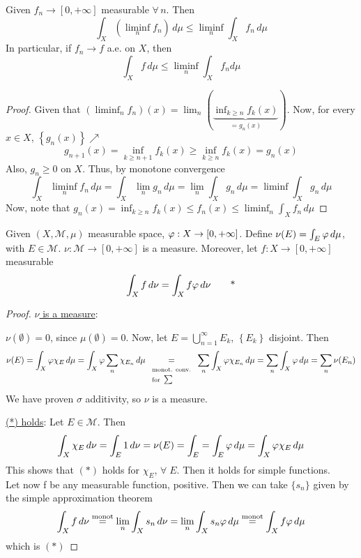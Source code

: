 \begin{lemma}
    Given \(f_n \to [0, +\infty]\) measurable \(\forall \, n\). Then 
    \[
        \int_X (\liminf_n f_n) \, d\mu \leq \liminf_n \int_X f_n \, d\mu
    \]
    In particular, if \(f_n \to f\) a.e. on \(X\), then
    \[
        \int_X f \, d\mu \leq \liminf_n \int_X f_n d\mu
    \]
\end{lemma}

\begin{proof}
    Given that \((\liminf_n f_n)(x) = \lim_n (\underbrace{\inf_{k \geq n} f_k(x)}_{= g_n (x)})\). Now, for every \(x \in X\), \(\left\{ g_n(x) \right\}\nearrow\)
    \[
        g_{n+1}(x) = \inf_{k \geq n+1} f_k(x) \geq \inf_{k \geq n} f_k(x) = g_n (x)
    \]
    Also, \(g_n \geq 0\) on \(X\). Thus, by monotone convergence
    \[
        \int_X \liminf_n f_n \, d\mu = \int_X \lim_n g_n \, d\mu = \lim_n \int_X g_n \, d\mu = \liminf \int_X g_n \, d\mu
    \]
    Now, note that \(g_n (x) = \inf_{k\geq n} f_k(x) \leq f_n(x) \leq \liminf_n \int_X f_n \, d\mu\) 
\end{proof}

\begin{theorem}
    Given \((X, \mathcal{M}, \mu)\) measurable space, \(\oldphi : X \to [0, +\infty]\). Define \(\nu(E) = \int_E \oldphi \, d\mu\), with \(E \in \mathcal{M}\). 
    \(\nu : \mathcal{M} \to [0, +\infty]\) is a measure. Moreover, let \(f:X \to [0, +\infty]\) measurable
    \[
        \int_X f \, d\nu = \int_X f\oldphi \, d\nu \tag*{*}
    \]
\end{theorem}
\begin{proof}
    \underline{\(\nu\) is a measure}:  

    \(\nu(\emptyset) = 0\), since \(\mu(\emptyset) = 0\). 
    Now, let \(E = \bigcup_{n=1}^{\infty} E_k\), \(\left\{ E_k \right\}\) disjoint. Then 
    \[
        \nu(E) = \int_X \oldphi\chi_{E} \, d\mu = \int_X \oldphi\sum_n \chi_{E_n} \, d\mu \underset{\begin{array}{l} \text{\scriptsize{monot. conv.}} \\ 
            \text{\scriptsize{for }}\textstyle\sum\end{array}}{=}  \sum_n \int_X \oldphi \chi_{E_n} \, d\mu = \sum_n \int_X \oldphi \, d\mu = \sum_n \nu(E_n) 
    \]
    We have proven \(\sigma\) additivity, so \(\nu\) is a measure.

    \underline{(*) holds}:
    Let \(E \in \mathcal{M}\). Then
    \[
        \int_X \chi_E \, d\nu = \int_E 1 \, d\nu = \nu(E) = \int_E = \int_E \oldphi \, d\mu = \int_X \oldphi \chi_E \, d\mu
    \]
    This shows that \((*)\) holds for \(\chi_E\), \(\forall \; E\). Then it holds for simple functions. \\
    Let now f be any measurable function, positive. Then we can take \(\{s_n\}\) given by the simple approximation theorem
    \[
        \int_X f \, d\nu \overset{\text{monot}}{=} \lim_n \int_X s_n \, d\nu = \lim_n \int_X s_n \oldphi \, d\mu \overset{\text{monot}}{=} \int_X f \oldphi \, d\mu 
    \]
    which is \((*)\) 
\end{proof}


